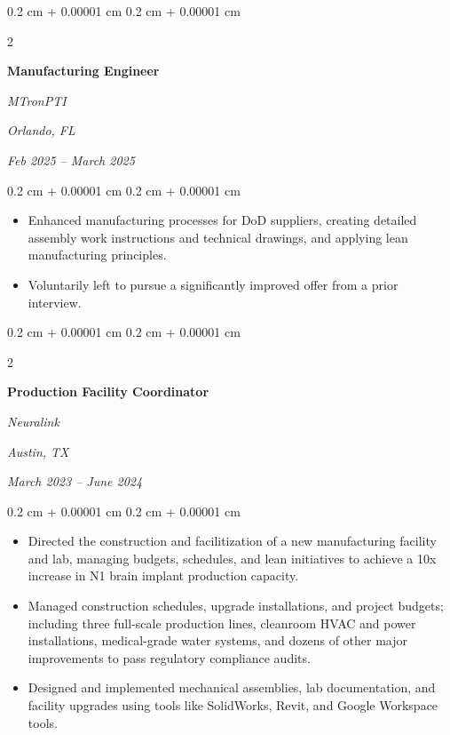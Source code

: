 \documentclass[10pt, letterpaper]{article}
\newenvironment{highlights}{
    \begin{itemize}[
        topsep=0.10 cm,
        parsep=0.10 cm,
        partopsep=0pt,
        itemsep=0pt,
        leftmargin=0.4 cm + 10pt
    ]
}{
    \end{itemize}
} %
\newenvironment{onecolentry}{
    \begin{adjustwidth}{
        0.2 cm + 0.00001 cm
    }{
        0.2 cm + 0.00001 cm
    }
}{
    \end{adjustwidth}
} %
\newenvironment{twocolentry}[2][]{
    \onecolentry
    \def\secondColumn{#2}
    \setcolumnwidth{\fill, 4.5 cm}
    \begin{paracol}{2}
}{
    \switchcolumn \raggedleft \secondColumn
    \end{paracol}
    \endonecolentry
} %
\begin{document}
        \vspace{0.35 cm}

        
        \begin{twocolentry}{
        \textit{Orlando, FL}    
            
        \textit{Feb 2025 – March 2025}}
            \textbf{Manufacturing Engineer}
            
            \textit{MTronPTI}
        \end{twocolentry}

        \vspace{0.10 cm}
        \begin{onecolentry}
            \begin{highlights}
                \item Enhanced manufacturing processes for DoD suppliers, creating detailed assembly work instructions and technical drawings, and applying lean manufacturing principles.
                \item Voluntarily left to pursue a significantly improved offer from a prior interview.
            \end{highlights}
        \end{onecolentry}


        \vspace{0.35 cm}

        \begin{twocolentry}{
        \textit{Austin, TX}    
            
        \textit{March 2023 – June 2024}}
            \textbf{Production Facility Coordinator}
            
            \textit{Neuralink}
        \end{twocolentry}

        \vspace{0.10 cm}
        \begin{onecolentry}
            \begin{highlights}
                \item Directed the construction and facilitization of a new manufacturing facility and lab, managing budgets, schedules, and lean initiatives to achieve a 10x increase in N1 brain implant production capacity.
                \item Managed construction schedules, upgrade installations, and project budgets; including three full-scale production lines, cleanroom HVAC and power installations, medical-grade water systems, and dozens of other major improvements to pass regulatory compliance audits.
                \item Designed and implemented mechanical assemblies, lab documentation, and facility upgrades using tools like SolidWorks, Revit, and Google Workspace tools.
            \end{highlights}
        \end{onecolentry}
\end{document}
